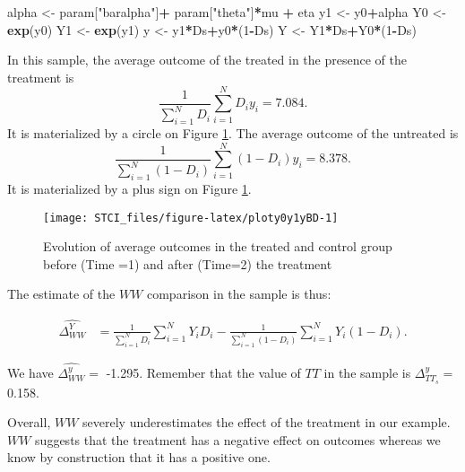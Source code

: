 \documentclass[]{book}
\newenvironment{Shaded}{\begin{snugshade}}{\end{snugshade}}
\newcommand{\DecValTok}[1]{\textcolor[rgb]{0.00,0.00,0.81}{#1}}
\newcommand{\KeywordTok}[1]{\textcolor[rgb]{0.13,0.29,0.53}{\textbf{#1}}}
\newcommand{\NormalTok}[1]{#1}
\newcommand{\OperatorTok}[1]{\textcolor[rgb]{0.81,0.36,0.00}{\textbf{#1}}}
\newcommand{\StringTok}[1]{\textcolor[rgb]{0.31,0.60,0.02}{#1}}
\theoremstyle{definition}
\theoremstyle{definition}
\theoremstyle{definition}
\theoremstyle{remark}
\begin{document}
\begin{Shaded}
\begin{Highlighting}[]
\NormalTok{alpha <-}\StringTok{ }\NormalTok{param[}\StringTok{"baralpha"}\NormalTok{]}\OperatorTok{+}\StringTok{  }\NormalTok{param[}\StringTok{"theta"}\NormalTok{]}\OperatorTok{*}\NormalTok{mu }\OperatorTok{+}\StringTok{ }\NormalTok{eta}
\NormalTok{y1 <-}\StringTok{ }\NormalTok{y0}\OperatorTok{+}\NormalTok{alpha}
\NormalTok{Y0 <-}\StringTok{ }\KeywordTok{exp}\NormalTok{(y0)}
\NormalTok{Y1 <-}\StringTok{ }\KeywordTok{exp}\NormalTok{(y1)}
\NormalTok{y <-}\StringTok{ }\NormalTok{y1}\OperatorTok{*}\NormalTok{Ds}\OperatorTok{+}\NormalTok{y0}\OperatorTok{*}\NormalTok{(}\DecValTok{1}\OperatorTok{-}\NormalTok{Ds)}
\NormalTok{Y <-}\StringTok{ }\NormalTok{Y1}\OperatorTok{*}\NormalTok{Ds}\OperatorTok{+}\NormalTok{Y0}\OperatorTok{*}\NormalTok{(}\DecValTok{1}\OperatorTok{-}\NormalTok{Ds)}
\end{Highlighting}
\end{Shaded}

In this sample, the average outcome of the treated in the presence of the treatment is
\[
\frac{1}{\sum_{i=1}^ND_i}\sum_{i=1}^ND_iy_i= 7.084.
\]
It is materialized by a circle on Figure \ref{fig:ploty0y1yBD}.
The average outcome of the untreated is
\[
\frac{1}{\sum_{i=1}^N(1-D_i)}\sum_{i=1}^N(1-D_i)y_i= 8.378.
\]
It is materialized by a plus sign on Figure \ref{fig:ploty0y1yBD}.

\begin{figure}

{\centering \texttt{[image: STCI\_files/figure-latex/ploty0y1yBD-1]} 

}

\caption{Evolution of average outcomes in the treated and control group before (Time =1) and after (Time=2) the treatment}\label{fig:ploty0y1yBD}
\end{figure}

The estimate of the \(WW\) comparison in the sample is thus:

\begin{align*}
\hat{\Delta^Y_{WW}} & = \frac{1}{\sum_{i=1}^N D_i}\sum_{i=1}^N Y_iD_i-\frac{1}{\sum_{i=1}^N (1-D_i)}\sum_{i=1}^N Y_i(1-D_i).
\end{align*}

We have \(\hat{\Delta^y_{WW}}=\) -1.295.
Remember that the value of \(TT\) in the sample is \(\Delta^y_{TT_s}=\) 0.158.

Overall, \(WW\) severely underestimates the effect of the treatment in our example.
\(WW\) suggests that the treatment has a negative effect on outcomes whereas we know by construction that it has a positive one.
\end{document}

